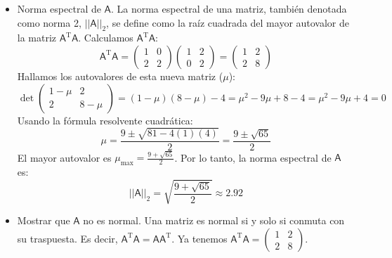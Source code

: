 \documentclass[11pt,spanish]{article}
\newcommand{\mat}[1]{\mathsf{#1}}
\begin{document}
\begin{itemize}
$$$$
Ahora multiplicamos por $\mat{U}$ por la izquierda:
$$
\mat{U}(\mat{A}\mat{V}) = \begin{pmatrix} 1 & -2 \\ 0 & 1 \end{pmatrix} \begin{pmatrix} 1 & 4 \\ 0 & 2 \end{pmatrix} = \begin{pmatrix} 1(1) + 0 & 1(4) - 2(2) \\ 0 + 0 & 0(4) + 1(2) \end{pmatrix} = \begin{pmatrix} 1 & 0 \\ 0 & 2 \end{pmatrix}
$$
El resultado es, efectivamente, la matriz diagonal compuesta por los autovalores $\lambda_1 = 1$ y $\lambda_2 = 2$.
\item Norma espectral de $\mat{A}$.
La norma espectral de una matriz, también denotada como norma 2, $||\mat{A}||_2$, se define como la raíz cuadrada del mayor autovalor de la matriz $\mat{A}^\text{T}\mat{A}$.
Calculamos $\mat{A}^\text{T}\mat{A}$:
$$
\mat{A}^\text{T}\mat{A} = \begin{pmatrix} 1 & 0 \\ 2 & 2 \end{pmatrix} \begin{pmatrix} 1 & 2 \\ 0 & 2 \end{pmatrix} = \begin{pmatrix} 1 & 2 \\ 2 & 8 \end{pmatrix}
$$
Hallamos los autovalores de esta nueva matriz ($\mu$):
$$
\det \begin{pmatrix} 1-\mu & 2 \\ 2 & 8-\mu \end{pmatrix} = (1-\mu)(8-\mu) - 4 = \mu^2 - 9\mu + 8 - 4 = \mu^2 - 9\mu + 4 = 0
$$
Usando la fórmula resolvente cuadrática:
$$
\mu = \frac{9 \pm \sqrt{81 - 4(1)(4)}}{2} = \frac{9 \pm \sqrt{65}}{2}
$$
El mayor autovalor es $\mu_{\text{max}} = \frac{9 + \sqrt{65}}{2}$.
Por lo tanto, la norma espectral de $\mat{A}$ es:
$$
||\mat{A}||_2 = \sqrt{\frac{9 + \sqrt{65}}{2}} \approx 2.92
$$
\item Mostrar que $\mat{A}$ no es normal.
Una matriz es normal si y solo si conmuta con su traspuesta. 
Es decir, $\mat{A}^\text{T}\mat{A} = \mat{A}\mat{A}^\text{T}$.
Ya tenemos $\mat{A}^\text{T}\mat{A} = \begin{pmatrix} 1 & 2 \\ 2 & 8 \end{pmatrix}$.

\end{itemize}
\end{document}
